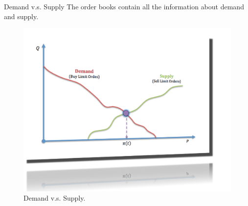 \documentclass{beamer}
\begin{document}
\begin{frame}[shrink=30]{{\color{cyan}Demand v.s. Supply}}
\bigskip
The order books contain all the information about demand and supply.
\begin{figure}[htbp]
	\centering
	\includegraphics[height=0.9\textheight]{Demand_Supply.png}
        \caption{Demand v.s. Supply.}
        \label{fig:demand_supply}
\end{figure}

\end{frame}
\end{document}
